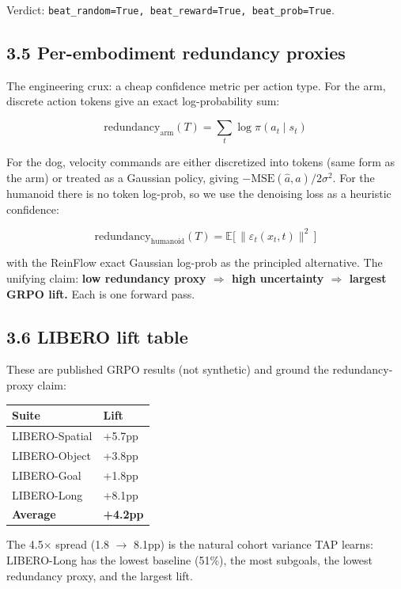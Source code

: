 \documentclass[11pt,letterpaper]{article}
\begin{document}
Verdict: \texttt{beat\_random=True, beat\_reward=True, beat\_prob=True}.

\subsection*{3.5 Per-embodiment redundancy proxies}

The engineering crux: a cheap confidence metric per action type. For the arm, discrete action tokens give an exact log-probability sum:

\[
\text{redundancy}_{\text{arm}}(T) = \sum_{t} \log \pi(a_t \mid s_t)
\]

For the dog, velocity commands are either discretized into tokens (same form as the arm) or treated as a Gaussian policy, giving $-\text{MSE}(\hat a, a)/2\sigma^2$. For the humanoid there is no token log-prob, so we use the denoising loss as a heuristic confidence:

\[
\text{redundancy}_{\text{humanoid}}(T) = \mathbb{E}\big[\, \lVert \varepsilon_t(x_t, t) \rVert^2 \,\big]
\]

with the ReinFlow exact Gaussian log-prob as the principled alternative. The unifying claim: \textbf{low redundancy proxy $\Rightarrow$ high uncertainty $\Rightarrow$ largest GRPO lift.} Each is one forward pass.

\subsection*{3.6 LIBERO lift table}

These are published GRPO results (not synthetic) and ground the redundancy-proxy claim:

\begin{center}
\begin{tabular}{ll}
\toprule
Suite & Lift \\
\midrule
LIBERO-Spatial & +5.7pp \\
LIBERO-Object & +3.8pp \\
LIBERO-Goal & +1.8pp \\
LIBERO-Long & +8.1pp \\
\textbf{Average} & \textbf{+4.2pp} \\
\bottomrule
\end{tabular}
\end{center}

The 4.5$\times$ spread (1.8 $\rightarrow$ 8.1pp) is the natural cohort variance TAP learns: LIBERO-Long has the lowest baseline (51\%), the most subgoals, the lowest redundancy proxy, and the largest lift.
\end{document}
